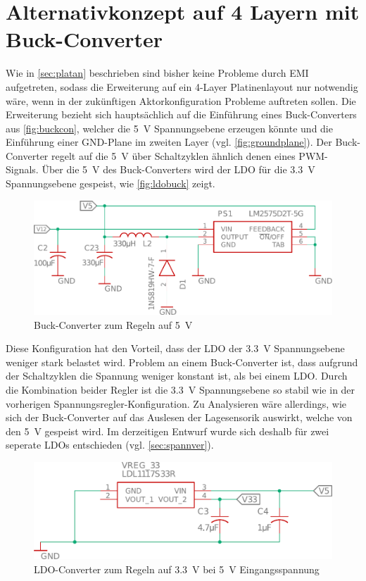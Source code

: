 \chapter{Alternativkonzept auf 4 Layern mit Buck-Converter}\label{app:4layer}
Wie in \autoref{sec:platan} beschrieben sind bisher keine Probleme durch EMI aufgetreten, sodass die Erweiterung auf ein 4-Layer Platinenlayout nur notwendig wäre, wenn in der zukünftigen Aktorkonfiguration Probleme auftreten sollen. Die Erweiterung bezieht sich hauptsächlich auf die Einführung eines Buck-Converters aus \autoref{fig:buckcon}, welcher die \SI{5}{V} Spannungsebene erzeugen könnte und die Einführung einer GND-Plane im zweiten Layer (vgl. \autoref{fig:groundplane}). Der Buck-Converter regelt auf die \SI{5}{V} über Schaltzyklen ähnlich denen eines PWM-Signals. Über die \SI{5}{V} des Buck-Converters wird der LDO für die \SI{3,3}{V} Spannungsebene gespeist, wie \autoref{fig:ldobuck} zeigt.
\begin{figure}[H]%
\centering
\includegraphics[width=0.8\columnwidth]{./Bilder/buck}%
\caption{Buck-Converter zum Regeln auf \SI{5}{V}}%
\label{fig:buckcon}%
\end{figure}\noindent
Diese Konfiguration hat den Vorteil, dass der LDO der \SI{3,3}{V} Spannungsebene weniger stark belastet wird. Problem an einem Buck-Converter ist, dass aufgrund der Schaltzyklen die Spannung weniger konstant ist, als bei einem LDO. Durch die Kombination beider Regler ist die \SI{3,3}{V} Spannungsebene so stabil wie in der vorherigen Spannungsregler-Konfiguration. Zu Analysieren wäre allerdings, wie sich der Buck-Converter auf das Auslesen der Lagesensorik auswirkt, welche von den \SI{5}{V} gespeist wird. Im derzeitigen Entwurf wurde sich deshalb für zwei seperate LDOs entschieden (vgl. \autoref{sec:spannver}).
\begin{figure}[H]%
\centering
\includegraphics[width=0.8\columnwidth]{./Bilder/v334layer}%
\caption{LDO-Converter zum Regeln auf \SI{3,3}{V} bei \SI{5}{V} Eingangsspannung}%
\label{fig:ldobuck}%
\end{figure}\noindent
